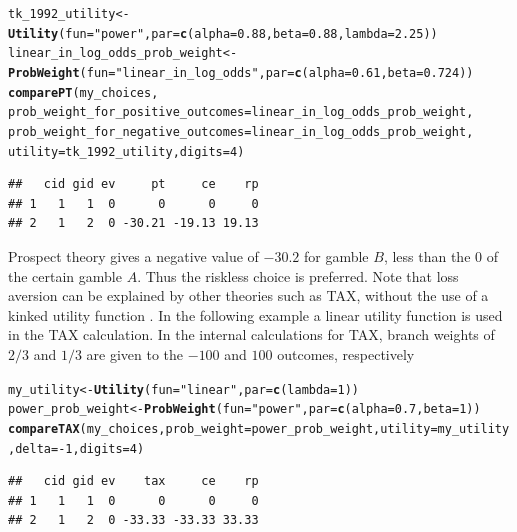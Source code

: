 \documentclass{article}\usepackage[]{graphicx}\usepackage[]{color}
\makeatletter
\newcommand{\hlnum}[1]{\textcolor[rgb]{0.686,0.059,0.569}{#1}}%
\newcommand{\hlstr}[1]{\textcolor[rgb]{0.192,0.494,0.8}{#1}}%
\newcommand{\hlopt}[1]{\textcolor[rgb]{0,0,0}{#1}}%
\newcommand{\hlstd}[1]{\textcolor[rgb]{0.345,0.345,0.345}{#1}}%
\newcommand{\hlkwb}[1]{\textcolor[rgb]{0.69,0.353,0.396}{#1}}%
\newcommand{\hlkwc}[1]{\textcolor[rgb]{0.333,0.667,0.333}{#1}}%
\newcommand{\hlkwd}[1]{\textcolor[rgb]{0.737,0.353,0.396}{\textbf{#1}}}%
\newenvironment{kframe}{%
 \def\at@end@of@kframe{}%
 \ifinner\ifhmode%
  \def\at@end@of@kframe{\end{minipage}}%
  \begin{minipage}{\columnwidth}%
 \fi\fi%
 \def\FrameCommand##1{\hskip\@totalleftmargin \hskip-\fboxsep
 \colorbox{shadecolor}{##1}\hskip-\fboxsep
     \hskip-\linewidth \hskip-\@totalleftmargin \hskip\columnwidth}%
 \MakeFramed {\advance\hsize-\width
   \@totalleftmargin\z@ \linewidth\hsize
   \@setminipage}}%
 {\par\unskip\endMakeFramed%
 \at@end@of@kframe}
\newenvironment{knitrout}{}{} %
\makeatother
\begin{document}
\begin{knitrout}
\color{fgcolor}\begin{kframe}
\begin{alltt}
\hlstd{tk_1992_utility} \hlkwb{<-} \hlkwd{Utility}\hlstd{(}\hlkwc{fun}\hlstd{=}\hlstr{"power"}\hlstd{,} \hlkwc{par}\hlstd{=}\hlkwd{c}\hlstd{(}\hlkwc{alpha}\hlstd{=}\hlnum{0.88}\hlstd{,} \hlkwc{beta}\hlstd{=}\hlnum{0.88}\hlstd{,} \hlkwc{lambda}\hlstd{=}\hlnum{2.25}\hlstd{))}
\hlstd{linear_in_log_odds_prob_weight} \hlkwb{<-} \hlkwd{ProbWeight}\hlstd{(}\hlkwc{fun}\hlstd{=}\hlstr{"linear_in_log_odds"}\hlstd{,} \hlkwc{par}\hlstd{=}\hlkwd{c}\hlstd{(}\hlkwc{alpha}\hlstd{=}\hlnum{0.61}\hlstd{,} \hlkwc{beta}\hlstd{=}\hlnum{0.724}\hlstd{))}
\hlkwd{comparePT}\hlstd{(my_choices,}
        \hlkwc{prob_weight_for_positive_outcomes}\hlstd{=linear_in_log_odds_prob_weight,}
        \hlkwc{prob_weight_for_negative_outcomes}\hlstd{=linear_in_log_odds_prob_weight,}
        \hlkwc{utility}\hlstd{=tk_1992_utility,} \hlkwc{digits}\hlstd{=}\hlnum{4}\hlstd{)}
\end{alltt}
\begin{verbatim}
##   cid gid ev     pt     ce    rp
## 1   1   1  0      0      0     0
## 2   1   2  0 -30.21 -19.13 19.13
\end{verbatim}
\end{kframe}
\end{knitrout}


Prospect theory gives a negative value of $-30.2$ for gamble $B$, less than the $0$ of the certain gamble $A$. Thus
the riskless choice is preferred.
Note that loss aversion can be explained by other theories such as TAX, without the use of a kinked utility
function \citep*{Birnbaum_2006}. In the following example a linear utility function is used in the TAX calculation. In the internal calculations for TAX, branch weights of $2/3$ and
$1/3$ are given to the $-100$ and $100$ outcomes, respectively

\begin{knitrout}
\color{fgcolor}\begin{kframe}
\begin{alltt}
\hlstd{my_utility} \hlkwb{<-} \hlkwd{Utility}\hlstd{(}\hlkwc{fun}\hlstd{=}\hlstr{"linear"}\hlstd{,} \hlkwc{par}\hlstd{=}\hlkwd{c}\hlstd{(}\hlkwc{lambda}\hlstd{=}\hlnum{1}\hlstd{))}
\hlstd{power_prob_weight} \hlkwb{<-} \hlkwd{ProbWeight}\hlstd{(}\hlkwc{fun}\hlstd{=}\hlstr{"power"}\hlstd{,} \hlkwc{par}\hlstd{=}\hlkwd{c}\hlstd{(}\hlkwc{alpha}\hlstd{=}\hlnum{0.7}\hlstd{,} \hlkwc{beta}\hlstd{=}\hlnum{1}\hlstd{))}
\hlkwd{compareTAX}\hlstd{(my_choices,} \hlkwc{prob_weight}\hlstd{=power_prob_weight,} \hlkwc{utility}\hlstd{=my_utility,} \hlkwc{delta}\hlstd{=}\hlopt{-}\hlnum{1}\hlstd{,} \hlkwc{digits}\hlstd{=}\hlnum{4}\hlstd{)}
\end{alltt}
\begin{verbatim}
##   cid gid ev    tax     ce    rp
## 1   1   1  0      0      0     0
## 2   1   2  0 -33.33 -33.33 33.33
\end{verbatim}
\end{kframe}
\end{knitrout}
\end{document}
